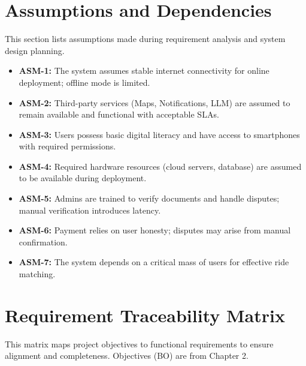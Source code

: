 \section{Assumptions and Dependencies}

This section lists assumptions made during requirement analysis and system design planning.

\begin{itemize}
\item \textbf{ASM-1:} The system assumes stable internet connectivity for online deployment; offline mode is limited.
\item \textbf{ASM-2:} Third-party services (Maps, Notifications, LLM) are assumed to remain available and functional with acceptable SLAs.
\item \textbf{ASM-3:} Users possess basic digital literacy and have access to smartphones with required permissions.
\item \textbf{ASM-4:} Required hardware resources (cloud servers, database) are assumed to be available during deployment.
\item \textbf{ASM-5:} Admins are trained to verify documents and handle disputes; manual verification introduces latency.
\item \textbf{ASM-6:} Payment relies on user honesty; disputes may arise from manual confirmation.
\item \textbf{ASM-7:} The system depends on a critical mass of users for effective ride matching.
\end{itemize}

\clearpage
\section{Requirement Traceability Matrix}

This matrix maps project objectives to functional requirements to ensure alignment and completeness. Objectives (BO) are from Chapter 2.

